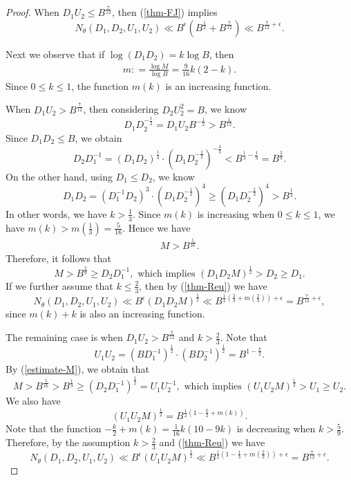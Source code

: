 \documentclass[10pt,a4paper]{amsart}
\renewcommand{\geq}{\geqslant}
\renewcommand{\leq}{\leqslant}
\begin{document}
\begin{proof}
	When $D_1 U_2 \leq B^{\frac{7}{12}}$, then (\ref{thm-FJ}) implies 
	$$N_\theta(D_1, D_2, U_1, U_2) \ll B^\epsilon (B^{\frac{1}{2}} + B^{\frac{7}{12}}) \ll B^{\frac{7}{12} + \epsilon}.$$
	
    Next we observe that if $\log (D_1D_2) = k \log B$, then 
    \begin{eqnarray}\label{log-M}
    	m: = \frac{\log M}{\log B} = \frac{9}{16} k (2 - k).
    \end{eqnarray}
    Since $0 \leq k \leq 1$, the function $m(k)$ is an increasing function. 
	
	When $D_1 U_2 > B^{\frac{7}{12}}$, then considering $D_2U_2^2 = B$, we know 
	$$D_1 D_2^{-\frac{1}{2}} = D_1U_2B^{-\frac{1}{2}} > B^{\frac{1}{12}}.$$ 
	Since $D_1D_2 \leq B$, we obtain
	$$D_2D_1^{-1} = (D_1D_2)^{\frac{1}{3}} \cdot (D_1D_2^{-\frac{1}{2}})^{-\frac{4}{3}} < B^{\frac{1}{3} - \frac{1}{9}} =    B^{\frac{2}{9}}.$$
	On the other hand, using $D_1 \leq D_2$, we know  $$D_1D_2 = (D_1^{-1}D_2)^3 \cdot (D_1D_2^{-\frac{1}{2}})^4 \geq (D_1 D_2^{-\frac{1}{2}})^4 > B^{\frac{1}{3}}.$$ 
	In other words, we have $k > \frac{1}{3}$. Since $m(k)$ is increasing when $0 \leq k \leq 1$, we have $m(k) > m(\frac{1}{3}) = \frac{5}{16}$. Hence we have
	\begin{eqnarray}\label{estimate-M}
		M > B^{\frac{5}{16}}.
	\end{eqnarray}
	Therefore, it follows that 
	$$M > B^{\frac{2}{9}} \geq D_2D_1^{-1}, \text{ which implies } (D_1D_2M)^{\frac{1}{2}} > D_2 \geq D_1.$$
	If we further assume that $k \leq \frac{2}{3}$, then by (\ref{thm-Reu}) we have
	$$N_\theta(D_1, D_2, U_1, U_2) \ll B^\epsilon (D_1D_2M)^{\frac{1}{2}} \ll B^{\frac{1}{2}(\frac{2}{3} + m(\frac{2}{3})) + \epsilon} = B^{\frac{7}{12} + \epsilon},$$
	since $m(k) + k$ is also an increasing function. 
	
The remaining case is when $D_1 U_2 > B^{\frac{7}{12}}$ and $k > \frac{2}{3}$. Note that $$U_1U_2 = (BD_1^{-1})^{\frac{1}{2}} \cdot (BD_2^{-1})^{\frac{1}{2}} = B^{1 - \frac{k}{2}}.$$ 
By (\ref{estimate-M}), we obtain that
$$M > B^{\frac{5}{16}} > B^{\frac{1}{9}} \geq (D_2D_1^{-1})^{\frac{1}{2}} = U_1U_2^{-1}, \text{ which implies }  (U_1U_2M)^{\frac{1}{2}} > U_1 \geq U_2.$$ 
We also have
$$(U_1U_2M)^{\frac{1}{2}} = B^{\frac{1}{2}(1  - \frac{k}{2} + m(k))}.$$
Note that the function 
$- \frac{k}{2} + m(k) = \frac{1}{16}k(10-9k)$
 is decreasing when $k > \frac{5}{9}$. Therefore, by the assumption $k > \frac{2}{3}$ and (\ref{thm-Reu}) we have
$$N_\theta(D_1, D_2, U_1, U_2) \ll B^\epsilon (U_1U_2M)^{\frac{1}{2}} \ll B^{\frac{1}{2}(1 - \frac{1}{3} + m(\frac{2}{3})) + \epsilon} = B^{\frac{7}{12} + \epsilon}.$$
	
	
	
	
\end{proof}
\end{document}
